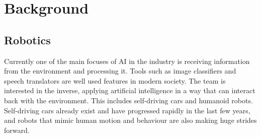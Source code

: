 \documentclass[8pt]{article}
\begin{document}
%	
%

\section {Background}
\subsection{Robotics}
Currently one of the main focuses of AI in the industry is receiving information from the environment and processing it. Tools such as image classifiers and speech translators are well used features in modern society. The team is interested in the inverse, applying artificial intelligence in a way that can interact back with the environment. This includes self-driving cars and humanoid robots. Self-driving cars already exist and have progressed rapidly in the last few years, and robots that mimic human motion and behaviour are also making huge strides forward.
\end{document}
